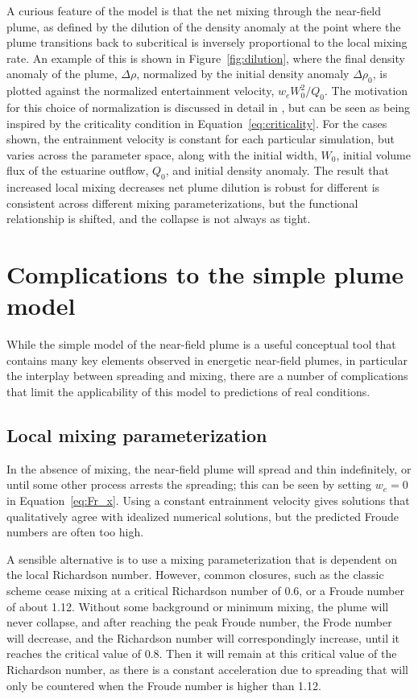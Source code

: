 \documentclass[12pt]{article}
\begin{document}
A curious feature of the model is that the net mixing through the near-field plume, as defined by the dilution of the density anomaly at the point where the plume transitions back to subcritical is inversely proportional to the local mixing rate. An example of this is shown in Figure~\ref{fig:dilution}, where the final density anomaly of the plume, $\Delta \rho$, normalized by the initial density anomaly $\Delta \rho_0$, is plotted against the normalized entertainment velocity, $w_e W_0^2 / Q_0$. The motivation for this choice of normalization is discussed in detail in \citet{hetland:10a}, but can be seen as being inspired by the criticality condition in Equation~\ref{eq:criticality}. For the cases shown, the entrainment velocity is constant for each particular simulation, but varies across the parameter space, along with the initial width, $W_0$, initial volume flux of the estuarine outflow, $Q_0$, and initial density anomaly. The result that increased local mixing decreases net plume dilution is robust for different is consistent across different mixing parameterizations, but the functional relationship is shifted, and the collapse is not always as tight.

\section{Complications to the simple plume model}

While the simple model of the near-field plume is a useful conceptual tool that contains many key elements observed in energetic near-field plumes, in particular the interplay between spreading and mixing, there are a number of complications that limit the applicability of this model to predictions of real conditions.

\subsection{Local mixing parameterization}

In the absence of mixing, the near-field plume will spread and thin indefinitely, or until some other process arrests the spreading; this can be seen by setting $w_e=0$ in Equation~\ref{eq:Fr_x}. Using a constant entrainment velocity gives solutions that qualitatively agree with idealized numerical solutions, but the predicted Froude numbers are often too high. 

A sensible alternative is to use a mixing parameterization that is dependent on the local Richardson number. However, common closures, such as the classic \citet{ellison.turner:59} scheme cease mixing at a critical Richardson number of 0.6, or a Froude number of about 1.12. Without some background or minimum mixing, the plume will never collapse, and after reaching the peak Froude number, the Frode number will decrease, and the Richardson number will correspondingly increase, until it reaches the critical value of 0.8. Then it will remain at this critical value of the Richardson number, as there is a constant acceleration due to spreading that will only be countered when the Froude number is higher than 1.12.
\end{document}
